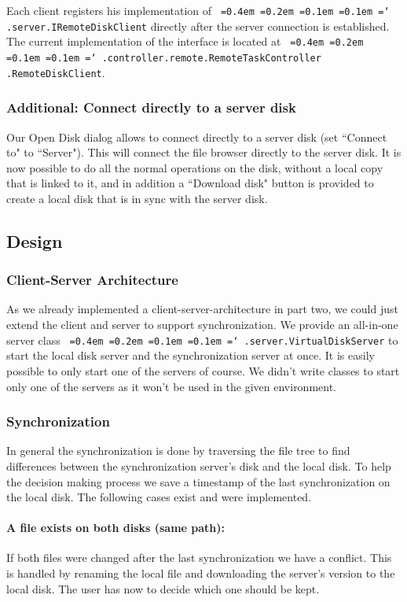 \documentclass[a4paper,12pt]{article}
\newcommand*\justify{%
  \fontdimen2\font=0.4em%
  \fontdimen3\font=0.2em%
  \fontdimen4\font=0.1em%
  \fontdimen7\font=0.1em%
  \hyphenchar\font=`\-%
}
\newcommand{\mono}[1]{\texttt{\justify #1}}
\begin{document}
Each client registers his implementation of \mono{.server.IRemoteDiskClient} directly after the server connection is established. The current implementation of the interface is located at \mono{.controller.remote.RemoteTaskController\\.RemoteDiskClient}.

\subsubsection{Additional: Connect directly to a server disk}
Our Open Disk dialog allows to connect directly to a server disk (set ``Connect to" to ``Server"). This will connect the file browser directly to the server disk. It is now possible to do all the normal operations on the disk, without a local copy that is linked to it, and in addition a ``Download disk" button is provided to create a local disk that is in sync with the server disk.

\subsection{Design}

\subsubsection{Client-Server Architecture}
As we already implemented a client-server-architecture in part two, we could just extend the client and server to support synchronization. We provide an all-in-one server class \mono{.server.VirtualDiskServer} to start the local disk server and the synchronization server at once. It is easily possible to only start one of the servers of course. We didn't write classes to start only one of the servers as it won't be used in the given environment.

\subsubsection{Synchronization}
In general the synchronization is done by traversing the file tree to find differences between the synchronization server's disk and the local disk. To help the decision making process we save a timestamp of the last synchronization on the local disk. The following cases exist and were implemented.

\paragraph{A file exists on both disks (same path):} If both files were changed after the last synchronization we have a conflict. This is handled by renaming the local file and downloading the server's version to the local disk. The user has now to decide which one should be kept.
\end{document}
